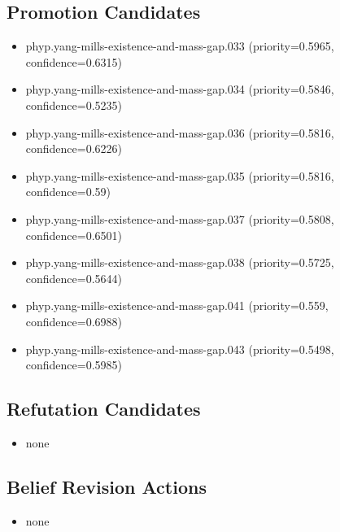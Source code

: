 \documentclass[
]{article}
\newcounter{none} %
\providecommand{\tightlist}{%
  \setlength{\itemsep}{0pt}\setlength{\parskip}{0pt}}
\begin{document}
\subsection{Promotion Candidates}\label{promotion-candidates}

\begin{itemize}
\tightlist
\item
  phyp.yang-mills-existence-and-mass-gap.033 (priority=0.5965,
  confidence=0.6315)
\item
  phyp.yang-mills-existence-and-mass-gap.034 (priority=0.5846,
  confidence=0.5235)
\item
  phyp.yang-mills-existence-and-mass-gap.036 (priority=0.5816,
  confidence=0.6226)
\item
  phyp.yang-mills-existence-and-mass-gap.035 (priority=0.5816,
  confidence=0.59)
\item
  phyp.yang-mills-existence-and-mass-gap.037 (priority=0.5808,
  confidence=0.6501)
\item
  phyp.yang-mills-existence-and-mass-gap.038 (priority=0.5725,
  confidence=0.5644)
\item
  phyp.yang-mills-existence-and-mass-gap.041 (priority=0.559,
  confidence=0.6988)
\item
  phyp.yang-mills-existence-and-mass-gap.043 (priority=0.5498,
  confidence=0.5985)
\end{itemize}

\subsection{Refutation Candidates}\label{refutation-candidates}

\begin{itemize}
\tightlist
\item
  none
\end{itemize}

\subsection{Belief Revision Actions}\label{belief-revision-actions}

\begin{itemize}
\tightlist
\item
  none
\end{itemize}
\end{document}

